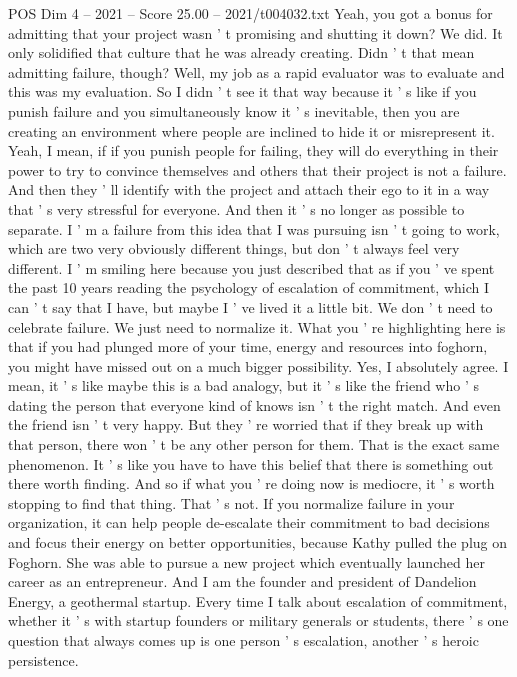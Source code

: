 \begin{textsample}{POS Dim 4 – 2021 – Score 25.00 – 2021/t004032.txt}
Yeah, you got a bonus for admitting that your project wasn ' t promising and shutting it down?
We did.
It only solidified that culture that he was already creating.
Didn ' t that mean admitting failure, though?
Well, my job as a rapid evaluator was to evaluate and this was my evaluation.
So I didn ' t see it that way because it ' s like if you punish failure and you simultaneously know it ' s inevitable, then you are creating an environment where people are inclined to hide it or misrepresent it.
Yeah, I mean, if if you punish people for failing, they will do everything in their power to try to convince themselves and others that their project is not a failure.
And then they ' ll identify with the project and attach their ego to it in a way that ' s very stressful for everyone.
And then it ' s no longer as possible to separate.
I ' m a failure from this idea that I was pursuing isn ' t going to work, which are two very obviously different things, but don ' t always feel very different.
I ' m smiling here because you just described that as if you ' ve spent the past 10 years reading the psychology of escalation of commitment, which I can ' t say that I have, but maybe I ' ve lived it a little bit.
We don ' t need to celebrate failure.
We just need to normalize it.
What you ' re highlighting here is that if you had plunged more of your time, energy and resources into foghorn, you might have missed out on a much bigger possibility.
Yes, I absolutely agree.
I mean, it ' s like maybe this is a bad analogy, but it ' s like the friend who ' s dating the person that everyone kind of knows isn ' t the right match.
And even the friend isn ' t very happy.
But they ' re worried that if they break up with that person, there won ' t be any other person for them.
That is the exact same phenomenon.
It ' s like you have to have this belief that there is something out there worth finding.
And so if what you ' re doing now is mediocre, it ' s worth stopping to find that thing.
That ' s not.
If you normalize failure in your organization, it can help people de-escalate their commitment to bad decisions and focus their energy on better opportunities, because Kathy pulled the plug on Foghorn.
She was able to pursue a new project which eventually launched her career as an entrepreneur.
And I am the founder and president of Dandelion Energy, a geothermal startup.
Every time I talk about escalation of commitment, whether it ' s with startup founders or military generals or students, there ' s one question that always comes up is one person ' s escalation, another ' s heroic persistence.

\end{textsample}
